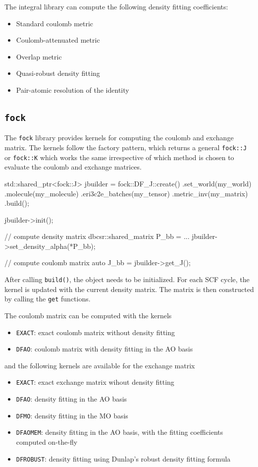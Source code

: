 The integral library can compute the following density fitting coefficients:
\begin{itemize}
\item Standard coulomb metric
\item Coulomb-attenuated metric
\item Overlap metric
\item Quasi-robust density fitting
\item Pair-atomic resolution of the identity
\end{itemize}

\subsection{\texttt{fock}}

The \texttt{fock} library provides kernels for computing the coulomb and exchange matrix. The kernels follow the factory pattern, which returns a general \texttt{fock::J} or \texttt{fock::K} which works the same irrespective of which method is chosen to evaluate the coulomb and exchange matrices.
\begin{cppinline}
std::shared_ptr<fock::J> 
jbuilder = fock::DF_J::create()
	.set_world(my_world)
	.molecule(my_molecule)
	.eri3c2e_batches(my_tensor)
	.metric_inv(my_matrix)
	.build();
	
jbuilder->init();

// compute density matrix 
dbcsr::shared_matrix P_bb = ...
jbuilder->set_density_alpha(*P_bb);

// compute coulomb matrix
auto J_bb = jbuilder->get_J();
\end{cppinline} 
\noindent After calling \texttt{build()}, the object needs to be initialized. For each SCF cycle, the kernel is updated with the current density matrix. The matrix is then constructed by calling the \texttt{get} functions.

The coulomb matrix can be computed with the kernels
\begin{itemize}
\item \texttt{EXACT}: exact coulomb matrix without density fitting
\item \texttt{DFAO}: coulomb matrix with density fitting in the AO basis
\end{itemize}
\noindent and the following kernels are available for the exchange matrix
\begin{itemize}
\item \texttt{EXACT}: exact exchange matrix wihout density fitting
\item \texttt{DFAO}: density fitting in the AO basis
\item \texttt{DFMO}: density fitting in the MO basis
\item \texttt{DFAOMEM}: density fitting in the AO basis, with the fitting coefficients computed on-the-fly
\item \texttt{DFROBUST}: density fitting using Dunlap's robust density fitting formula 
\end{itemize}

